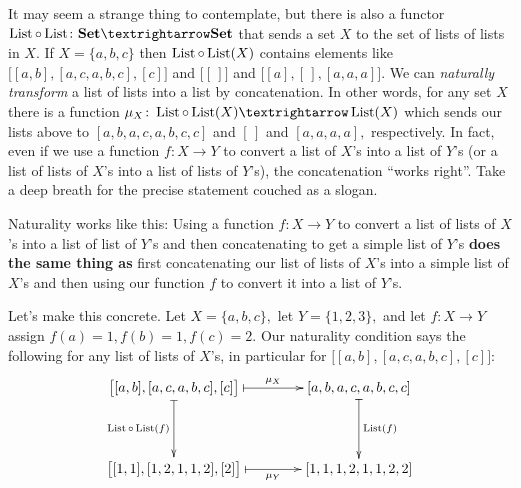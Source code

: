 \documentclass[../main/CT4S-EN-RU]{subfiles}
\begin{document}
\begin{blockENG}
It may seem a strange thing to contemplate, but there is also a functor $\List\circ\List\colon\Set{→}\Set$ that sends a set $X$ to the set of lists of lists in $X.$ If $X=\{a,b,c\}$ then $\operatorname{List}\circ\operatorname{List}(X)$ contains elements like $\big[[a,b],[a,c,a,b,c],[c]\big]$ and $\big[[\,]\big]$ and $\big[[a],[\,],[a,a,a]\big].$ We can {\em naturally transform} a list of lists into a list by concatenation. In other words, for any set $X$ there is a function $\mu_X\colon\List\circ\List(X){→}\List(X)$ which sends our lists above to $[a,b,a,c,a,b,c,c]$ and $[\,]$ and $[a,a,a,a],$ respectively. In fact, even if we use a function $f\colon X{→} Y$ to convert a list of $X$'s into a list of $Y$'s (or a list of lists of $X$'s into a list of lists of $Y$'s), the concatenation “works right”. Take a deep breath for the precise statement couched as a slogan.
\end{blockENG}

\begin{blockRUS}
\end{blockRUS}

\begin{sloganENG}
Naturality works like this: Using a function $f\colon X{→} Y$ to convert a list of lists of $X$'s into a list of list of $Y$'s and then concatenating to get a simple list of $Y$'s {\bf does the same thing as} first concatenating our list of lists of $X$'s into a simple list of $X$'s and then using our function $f$ to convert it into a list of $Y$'s.
\end{sloganENG}

\begin{sloganRUS}
\end{sloganRUS}

\begin{blockENG}
Let's make this concrete. Let $X=\{a,b,c\},$ let $Y=\{1,2,3\},$ and let $f\colon X{→} Y$ assign $f(a)=1, f(b)=1, f(c)=2.$ Our naturality condition says the following for any list of lists of $X$'s, in particular for $\big[[a,b],[a,c,a,b,c],[c]\big]$:
$$\xymatrix@=40pt{
\big[[a,b],[a,c,a,b,c],[c]\big]\ar@{|->}[r]^-{\mu_X}\ar@{|->}[d]_{\List\circ\List(f)}&[a,b,a,c,a,b,c,c]\ar@{|->}[d]^{\List(f)}\\
\big[[1,1],[1,2,1,1,2],[2]\big]\ar@{|->}[r]_-{\mu_Y}&[1,1,1,2,1,1,2,2]
}
$$
\end{blockENG}

\begin{blockRUS}
\end{blockRUS}
\end{document}
